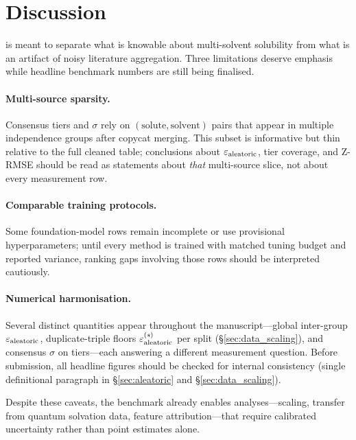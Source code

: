 \section{Discussion}
\label{sec:discussion}

\scthree{} is meant to separate what is knowable about multi-solvent solubility from what is an artifact of noisy literature aggregation.
Three limitations deserve emphasis while headline benchmark numbers are still being finalised.

\paragraph{Multi-source sparsity.}
Consensus tiers and $\sigma$ rely on $(\text{solute},\text{solvent})$ pairs that appear in multiple independence groups after copycat merging.
This subset is informative but thin relative to the full cleaned table; conclusions about $\varepsilon_{\text{aleatoric}}$, tier coverage, and Z-RMSE should be read as statements about \emph{that} multi-source slice, not about every measurement row.

\paragraph{Comparable training protocols.}
Some foundation-model rows remain incomplete or use provisional hyperparameters; until every method is trained with matched tuning budget and reported variance, ranking gaps involving those rows should be interpreted cautiously.

\paragraph{Numerical harmonisation.}
Several distinct quantities appear throughout the manuscript---global inter-group $\varepsilon_{\text{aleatoric}}$, duplicate-triple floors $\varepsilon_{\text{aleatoric}}^{(s)}$ per split (§\ref{sec:data_scaling}), and consensus $\sigma$ on tiers---each answering a different measurement question.
Before submission, all headline figures should be checked for internal consistency (single definitional paragraph in §\ref{sec:aleatoric} and §\ref{sec:data_scaling}).

Despite these caveats, the benchmark already enables analyses---scaling, transfer from quantum solvation data, feature attribution---that require calibrated uncertainty rather than point estimates alone.
